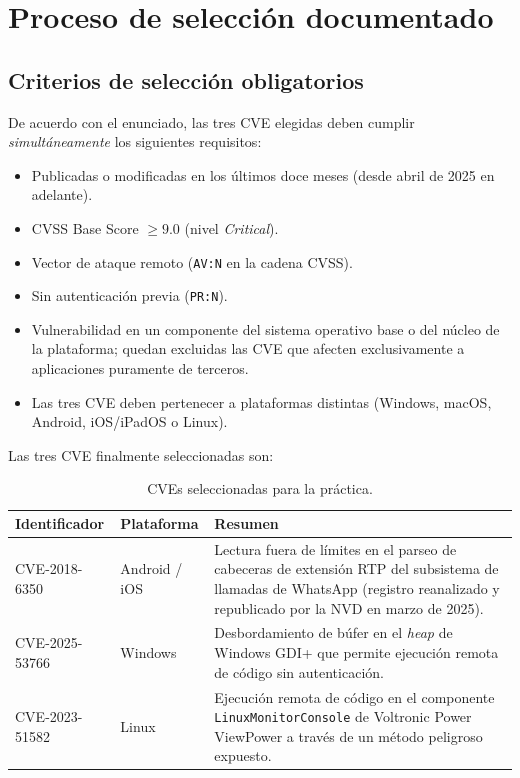 \chapter{Proceso de selección documentado}

\section{Criterios de selección obligatorios}

De acuerdo con el enunciado, las tres CVE elegidas deben cumplir \emph{simultáneamente} los siguientes requisitos:

\begin{itemize}[leftmargin=*]
    \item Publicadas o modificadas en los últimos doce meses (desde abril de 2025 en adelante).
    \item CVSS Base Score $\geq 9.0$ (nivel \textit{Critical}).
    \item Vector de ataque remoto (\texttt{AV:N} en la cadena CVSS).
    \item Sin autenticación previa (\texttt{PR:N}).
    \item Vulnerabilidad en un componente del sistema operativo base o del núcleo de la plataforma; quedan excluidas las CVE que afecten exclusivamente a aplicaciones puramente de terceros.
    \item Las tres CVE deben pertenecer a plataformas distintas (Windows, macOS, Android, iOS/iPadOS o Linux).
\end{itemize}

Las tres CVE finalmente seleccionadas son:

\begin{table}[H]
\centering
\renewcommand{\arraystretch}{1.3}
\begin{tabularx}{\textwidth}{|l|l|X|}
\hline
\rowcolor{lightblue}
\textbf{Identificador} & \textbf{Plataforma} & \textbf{Resumen} \\ \hline
CVE-2018-6350 & Android / iOS & Lectura fuera de límites en el parseo de cabeceras de extensión RTP del subsistema de llamadas de WhatsApp (registro reanalizado y republicado por la NVD en marzo de 2025). \\ \hline
CVE-2025-53766 & Windows & Desbordamiento de búfer en el \textit{heap} de Windows GDI+ que permite ejecución remota de código sin autenticación. \\ \hline
CVE-2023-51582 & Linux & Ejecución remota de código en el componente \texttt{LinuxMonitorConsole} de Voltronic Power ViewPower a través de un método peligroso expuesto. \\ \hline
\end{tabularx}
\caption{CVEs seleccionadas para la práctica.}
\end{table}

